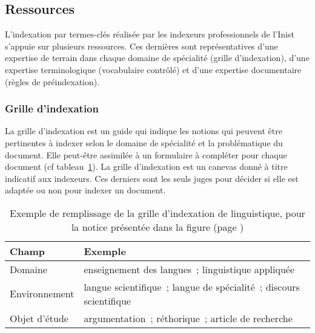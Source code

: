     \subsection{Ressources}
    \label{subsec:main-domain_specific_keyphrase_annotation-manual_keyphrase_annotation-resources}
      L'indexation par termes-clés réalisée par les indexeurs professionnels de
      l'Inist s'appuie sur plusieurs ressources. Ces dernières sont
      représentatives d'une expertise de terrain dans chaque domaine de
      spécialité (grille d'indexation), d'une expertise terminologique
      (vocabulaire contrôlé) et d'une expertise documentaire (règles de
      préindexation).

      \subsubsection{Grille d'indexation}
      \label{subsubsec:main-domain_specific_keyphrase_annotation-manual_keyphrase_annotation-resources-indexing_guidelines}
        La grille d'indexation est un guide qui indique les notions qui peuvent
        être pertinentes à indexer selon le domaine de spécialité et la
        problématique du document. Elle peut-être assimilée à un formulaire à
        compléter pour chaque document (cf tableau~\ref{fig:indexing_grid}). La
        grille d'indexation est un canevas donné à titre indicatif aux
        indexeurs. Ces derniers sont les seuls juges pour décider si elle est
        adaptée ou non pour indexer un document.
        \begin{table}[h!]
          \centering
          \begin{tabular}{l|l}
            \toprule
            \textbf{Champ} & \textbf{Exemple}\\
            \hline
            Domaine & enseignement des langues~; linguistique appliquée\\
            Environnement & langue scientifique~; langue de spécialité~; discours scientifique\\
            Objet d'étude & argumentation~; réthorique~; article de recherche\\
            \bottomrule
          \end{tabular}
          \caption[
            Exemple de remplissage de la grille d'indexation de linguistique
          ]{
            Exemple de remplissage de la grille d'indexation de linguistique,
            pour la notice présentée dans la figure  (page
            ) 
            \label{fig:indexing_grid}
          }
        \end{table}

